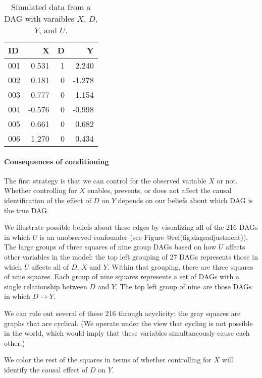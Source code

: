 \documentclass[
]{article}
\begin{document}
\begin{table}

\caption{\label{tab:identificationsimdf}Simulated data from a DAG with varaibles $X$, $D$, $Y$, and $U$.}
\centering
\begin{tabular}[t]{l|r|r|r}
\hline
ID & X & D & Y\\
\hline
001 & 0.531 & 1 & 2.240\\
\hline
002 & 0.181 & 0 & -1.278\\
\hline
003 & 0.777 & 0 & 1.154\\
\hline
004 & -0.576 & 0 & -0.998\\
\hline
005 & 0.661 & 0 & 0.682\\
\hline
006 & 1.270 & 0 & 0.434\\
\hline
\end{tabular}
\end{table}

\hypertarget{consequences-of-conditioning}{%
\paragraph{Consequences of
conditioning}\label{consequences-of-conditioning}}

The first strategy is that we can control for the observed variable
\(X\) or not. Whether controlling for \(X\) enables, prevents, or does
not affect the causal identification of the effect of \(D\) on \(Y\)
depends on our beliefs about which DAG is the true DAG.

We illustrate possible beliefs about these edges by visualizing all of
the 216 DAGs in which \(U\) is an unobserved confounder (see Figure
@ref(fig:dagsadjustment)). The large groups of three squares of nine
group DAGs based on how \(U\) affects other variables in the model: the
top left grouping of 27 DAGs represents those in which \(U\) affects all
of \(D\), \(X\) and \(Y\). Within that grouping, there are three squares
of nine squares. Each group of nine squares represents a set of DAGs
with a single relationship between \(D\) and \(Y\). The top left group
of nine are those DAGs in which \(D\rightarrow Y\).

We can rule out several of these 216 through acyclicity: the gray
squares are graphs that are cyclical. (We operate under the view that
cycling is not possible in the world, which would imply that these
variables simultaneously cause each other.)

We color the rest of the squares in terms of whether controlling for
\(X\) will identify the causal effect of \(D\) on \(Y\).
\end{document}
